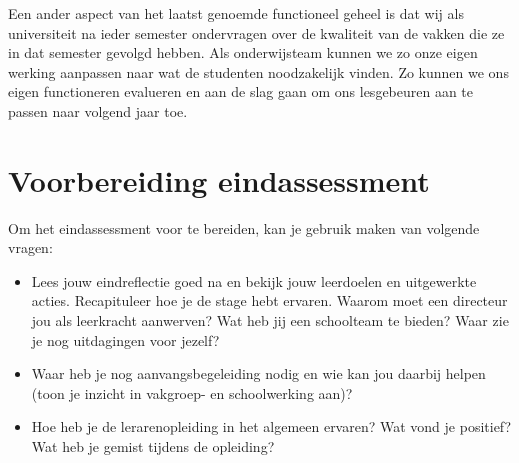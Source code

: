 \documentclass[a4paper,12pt,twoside]{article}%
\begin{document}
Een ander aspect van het laatst genoemde functioneel geheel is dat wij als universiteit na ieder semester ondervragen over de kwaliteit van de vakken die ze in dat semester gevolgd hebben. Als onderwijsteam kunnen we zo onze eigen werking aanpassen naar wat de studenten noodzakelijk vinden. Zo kunnen we ons eigen functioneren evalueren en aan de slag gaan om ons lesgebeuren aan te passen naar volgend jaar toe.\newline 
\newpage












\section{Voorbereiding eindassessment}

Om het eindassessment voor te bereiden, kan je gebruik maken van volgende vragen:
\begin{itemize}
	\item Lees jouw eindreflectie goed na en bekijk jouw leerdoelen en uitgewerkte acties. Recapituleer hoe je de stage hebt ervaren. Waarom moet een directeur jou als leerkracht aanwerven? Wat heb jij een schoolteam te bieden? Waar zie je nog uitdagingen voor jezelf? 
	\item Waar heb je nog aanvangsbegeleiding nodig en wie kan jou daarbij helpen (toon je inzicht in vakgroep- en schoolwerking aan)?
	\item Hoe heb je de lerarenopleiding in het algemeen ervaren? Wat vond je positief? Wat heb je gemist tijdens de opleiding?
\end{itemize} 
\end{document}
